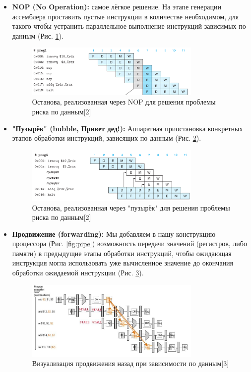 \documentclass[12pt,a4paper]{article}
\begin{document}
\begin{itemize}
    \item \textbf{NOP (No Operation):} самое лёгкое решение. На этапе генерации ассемблера проставить пустые инструкции в количестве необходимом, для такого чтобы устранить параллельное выполнение инструкций зависимых по данным (Рис. \ref{fig:nop}).
    \begin{figure}[ht!]
        \centering
        \includegraphics[width=0.8\textwidth]{nop.png}
        \caption{Останова, реализованная через NOP для решения проблемы риска по данным[2]}
        \label{fig:nop}
    \end{figure}

    \item \textbf{"Пузырёк" (bubble, Привет дед!): } Аппаратная приостановка конкретных этапов обработки инструкций, зависящих по данным (Рис. \ref{fig:babble}).
    \begin{figure}[ht!]
        \centering
        \includegraphics[width=0.8\textwidth]{babble.png}
        \caption{Останова, реализованная через "пузырёк" для решения проблемы риска по данным[2]}
        \label{fig:babble}
    \end{figure}

    \item \textbf{Продвижение (forwarding): } Мы добавляем в нашу конструкцию процессора (Рис. \ref{fig:pipe}) возможность передачи значений (регистров, либо памяти) в предыдущие этапы обработки инструкций, чтобы ожидающая инструкция могла использовать уже вычисленное значение до окончания обработки ожидаемой инструкции (Рис. \ref{fig:forwarding}).
    \begin{figure}[ht!]
        \centering
        \includegraphics[width=0.8\textwidth]{forwarding.png}
        \caption{Визуализация продвижения назад при зависимости по данным[3]}
        \label{fig:forwarding}
    \end{figure}
\end{itemize}
\end{document}
